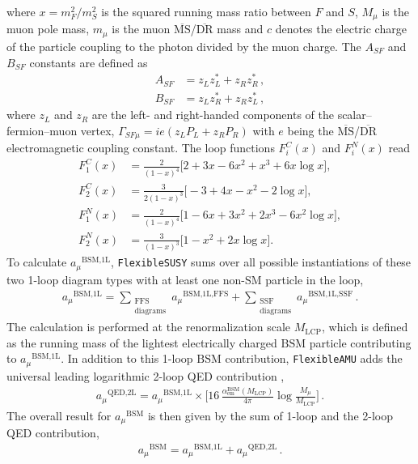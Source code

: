 \documentclass[final,3p,11pt,pdflatex]{elsarticle}
\makeatletter
\newcommand{\fs}{\texttt{FlexibleSUSY}\@\xspace}
\newcommand{\famu}{\texttt{FlexibleAMU}\@\xspace}
\newcommand{\ol}[1]{\overline{#1}}
\newcommand{\MSbar}{\ensuremath{\ol{\text{MS}}}\xspace}
\newcommand{\DRbar}{\ensuremath{\ol{\text{DR}}}\xspace}
\newcommand{\BSM}{\ensuremath{\text{BSM}}\xspace}
\newcommand{\MLCP}{\ensuremath{M_\text{LCP}}\xspace}
\newcommand{\QED}{\ensuremath{\text{QED}}}
\newcommand{\amu}{\ensuremath{a_\mu}\xspace}
\newcommand{\amuBSM}{\ensuremath{\amu^{\BSM}}\xspace}
\def\aem{\alpha_{\text{em}}}
\makeatother
\begin{document}
%
where $x=m_F^2/m_{S}^2$ is the squared running mass ratio between $F$ and $S$, $M_\mu$ is the muon pole mass,
$m_\mu$ is the muon \MSbar/\DRbar mass and $c$ denotes the electric charge of
the particle coupling to the photon divided by the muon charge.  The
$A_{SF}$ and $B_{SF}$ constants are defined as
%
\begin{align}
  \label{eq:ASF}
  A_{SF} &= z_L z_L^* + z_R z_R^* \,,\\
  \label{eq:BSF}
  B_{SF} &= z_L z_R^* + z_R z_L^* \,,
\end{align}
%
where $z_L$ and $z_R$ are the left- and right-handed components of the
scalar--fermion--muon vertex, $\Gamma_{SF\mu} =
ie(z_L P_L + z_R P_R)$ with $e$ being the \MSbar/\DRbar electromagnetic coupling constant.
%
The loop functions $F_i^C(x)$ and $F_i^N(x)$ read
%
\begin{align}
  F_1^C(x) &= \frac{2}{(1-x)^4} \Big[ 2 + 3x - 6x^2 + x^3 + 6x\log x \Big], \\
  F_2^C(x) &= \frac{3}{2(1-x)^3} \Big[ -3 + 4x - x^2 - 2\log x \Big], \\
  F_1^N(x) &= \frac{2}{(1-x)^4} \Big[ 1 - 6x + 3x^2 + 2x^3 - 6x^2\log x \Big], \\
  F_2^N(x) &= \frac{3}{(1-x)^3} \Big[ 1 - x^2 + 2x\log x \Big].
\end{align}
%
To calculate $\amu^{\BSM\text{,1L}}$, \fs sums over all possible
instantiations of these two 1-loop diagram types with at least one
non-SM particle in the loop,
%
\begin{align}
  \label{eq:amu BSM 1L}
  \amu^{\BSM\text{,1L}} =
  \sum_{\substack{\text{FFS}\\\text{diagrams}}} \amu^{\BSM\text{,1L,FFS}}
  + \sum_{\substack{\text{SSF}\\\text{diagrams}}} \amu^{\BSM\text{,1L,SSF}} \,.
\end{align}
%
The calculation is performed at the renormalization scale $\MLCP$, which
is defined as the running mass of the lightest electrically charged
\BSM particle contributing to $\amu^{\BSM\text{,1L}}$.  In addition to
this 1-loop \BSM contribution, \famu adds the universal leading
logarithmic 2-loop QED contribution \cite{Degrassi:1998es},
%
\begin{align}
  \amu^{\QED,\text{2L}} = \amu^{\BSM\text{,1L}} \times \Bigg[
    16 \, \frac{\aem^\BSM(\MLCP)}{4\pi}
    \log\frac{M_\mu}{\MLCP}
  \Bigg] \,.
\end{align}
%
The overall result for \amuBSM is then given by the sum of 1-loop and
the 2-loop QED contribution,
%
\begin{align}
  \amuBSM = \amu^{\BSM\text{,1L}} + \amu^{\QED,\text{2L}} \,.
\end{align}
\end{document}
